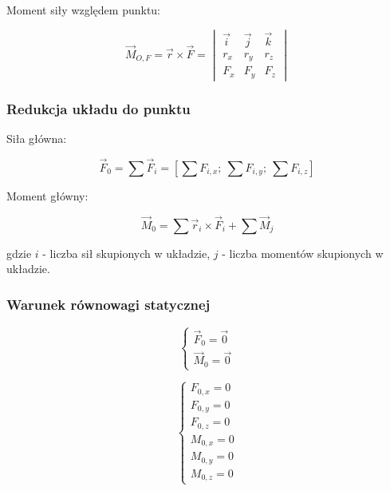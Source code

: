 Moment siły względem punktu:

\begin{equation}
    \Vec{M}_{O,F} = \Vec{r} \times \Vec{F} = \begin{vmatrix}
    \Vec{i} & \Vec{j} & \Vec{k} \\
    r_x & r_y & r_z \\
    F_x & F_y & F_z
    \end{vmatrix}
\end{equation}

\subsubsection*{Redukcja układu do punktu}

Siła główna:

\begin{equation}
    \Vec{F}_0 = \sum \Vec{F}_i = \left[ \sum F_{i,x};\ \sum F_{i,y};\ \sum F_{i,z} \right]
\end{equation}

Moment główny:

\begin{equation}
    \Vec{M}_0 = \sum \Vec{r}_i \times \Vec{F}_i + \sum \Vec{M}_j
\end{equation}

gdzie $i$ - liczba sił skupionych w układzie, $j$ - liczba momentów skupionych w układzie.

\subsubsection*{Warunek równowagi statycznej}

\begin{equation}
    \begin{cases}
        \Vec{F}_0 = \Vec{0} \\
        \Vec{M}_0 = \Vec{0}
    \end{cases}
\end{equation}

\begin{equation}
    \begin{cases}
        F_{0,x} = 0 \\
        F_{0,y} = 0 \\
        F_{0,z} = 0 \\
        M_{0,x} = 0 \\
        M_{0,y} = 0 \\
        M_{0,z} = 0
    \end{cases}
\end{equation}